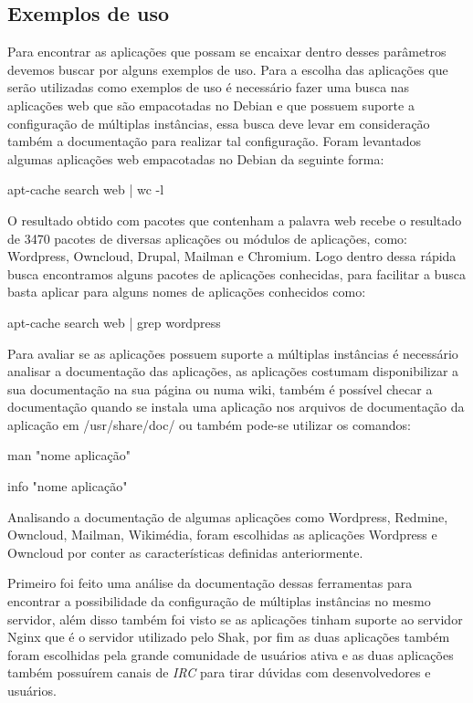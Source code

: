 \subsection{Exemplos de uso}
\label{subsection:exemplos}

Para encontrar as aplicações que possam se encaixar dentro desses parâmetros
devemos buscar por alguns exemplos de uso. Para a escolha das aplicações que
serão utilizadas como exemplos de uso é necessário fazer uma busca nas aplicações
web que são empacotadas no Debian e que possuem suporte a configuração de múltiplas
instâncias, essa busca deve levar em consideração também a documentação para realizar
tal configuração. Foram levantados algumas aplicações web empacotadas no Debian da
seguinte forma:

\begin{center}
apt-cache search web | wc -l
\end{center}

O resultado obtido com pacotes que contenham a palavra web recebe o resultado de 3470
pacotes de diversas aplicações ou módulos de aplicações, como:
Wordpress, Owncloud, Drupal, Mailman e Chromium. Logo dentro dessa rápida busca
encontramos alguns pacotes de aplicações conhecidas, para facilitar a busca basta
aplicar para alguns nomes de aplicações conhecidos como:

\begin{center}
apt-cache search web | grep wordpress
\end{center}

Para avaliar se as aplicações possuem suporte a múltiplas instâncias é necessário
analisar a documentação das aplicações, as aplicações costumam disponibilizar a sua
documentação na sua página ou numa wiki, também é possível checar a documentação
quando se instala uma aplicação nos arquivos de documentação da aplicação em
/usr/share/doc/ ou também pode-se utilizar os comandos:

\begin{center}
man "nome aplicação"

info "nome aplicação"
\end{center}

Analisando a documentação de algumas aplicações como Wordpress, Redmine,
Owncloud, Mailman, Wikimédia, foram escolhidas as aplicações Wordpress e Owncloud por
conter as características definidas anteriormente. 

Primeiro foi feito uma análise da documentação dessas ferramentas para encontrar a
possibilidade da configuração de múltiplas instâncias no mesmo servidor, além
disso também foi visto se as aplicações tinham suporte ao servidor Nginx que é
o servidor utilizado pelo Shak, por fim as duas aplicações também foram escolhidas
pela grande comunidade de usuários ativa e as duas aplicações também possuírem
canais de \textit{IRC} para tirar dúvidas com desenvolvedores e usuários. 

